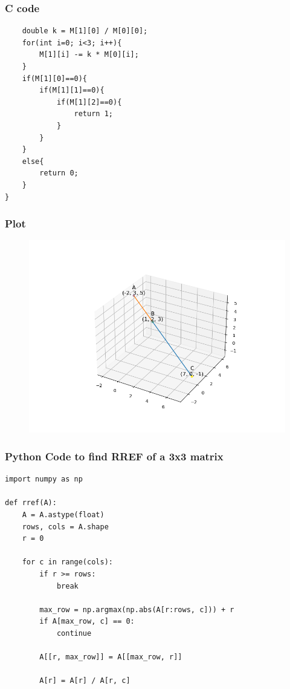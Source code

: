 \documentclass{beamer}
\begin{document}
\begin{frame}[fragile]
\frametitle{C code}
\begin{verbatim}
	double k = M[1][0] / M[0][0];
	for(int i=0; i<3; i++){
		M[1][i] -= k * M[0][i];
	}
	if(M[1][0]==0){
		if(M[1][1]==0){
			if(M[1][2]==0){
				return 1;
			}
		}
	}
	else{
		return 0;
	}
}
\end{verbatim}
\end{frame}

\begin{frame}
\frametitle{Plot}
\begin{figure}[h]
    \centering
    \includegraphics[width=\columnwidth]{figs/fig.png}
 \end{figure}
\end{frame}

\begin{frame}[fragile]
\frametitle{Python Code to find RREF of a 3x3 matrix}
\begin{verbatim}
import numpy as np

def rref(A):
    A = A.astype(float)
    rows, cols = A.shape
    r = 0
    
    for c in range(cols):
        if r >= rows:
            break
        
        max_row = np.argmax(np.abs(A[r:rows, c])) + r
        if A[max_row, c] == 0:
            continue
        
        A[[r, max_row]] = A[[max_row, r]]
        
        A[r] = A[r] / A[r, c]

\end{verbatim}
\end{frame}
\end{document}
